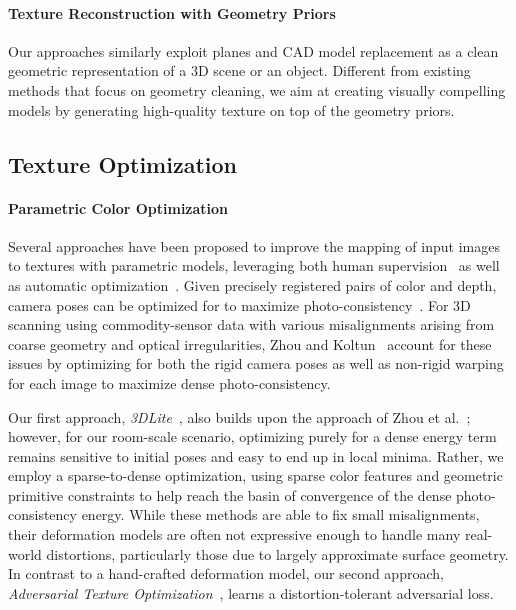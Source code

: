 \paragraph*{Texture Reconstruction with Geometry Priors} Our approaches similarly exploit planes and CAD model replacement as a clean geometric representation of a 3D scene or an object. Different from existing methods that focus on geometry cleaning, we aim at creating visually compelling models by generating high-quality texture on top of the geometry priors.

\subsection{Texture Optimization}
\paragraph*{Parametric Color Optimization}
Several approaches have been proposed to improve the mapping of input images to textures with parametric models,
leveraging both human supervision~\cite{franken2005minimizing,ofek1997multiresolution,neugebauer1999texturing,rocchini1999multiple,stamos20003d,pighin2006synthesizing,xu2019deep} as well as automatic optimization~\cite{bernardini2001high,pulli2000surface}. 
Given precisely registered pairs of color and depth, camera poses can be optimized for to maximize photo-consistency~\cite{johnson1999registration,pulli2000surface,pulli2005projective,bernardini2001high}. For 3D scanning using commodity-sensor data with various misalignments arising from coarse geometry and optical irregularities, Zhou and Koltun~\cite{zhou2014color} account for these issues by optimizing for both the rigid camera poses as well as non-rigid warping for each image to maximize dense photo-consistency.

Our first approach, \emph{3DLite}~\cite{huang20173dlite}, also builds upon the approach of Zhou et al.~\cite{zhou2014color}; however, for our room-scale scenario, optimizing purely for a dense energy term remains sensitive to initial poses and easy to end up in local minima. 
Rather, we employ a sparse-to-dense optimization, using sparse color features and geometric primitive constraints to help reach the basin of convergence of the dense photo-consistency energy.
While these methods are able to fix small misalignments, their deformation models are often not expressive enough to handle many real-world distortions, particularly those due to largely approximate surface geometry. 
In contrast to a hand-crafted deformation model, our second approach, \emph{Adversarial Texture Optimization}~\cite{huang2020adversarial}, learns a distortion-tolerant adversarial loss.

